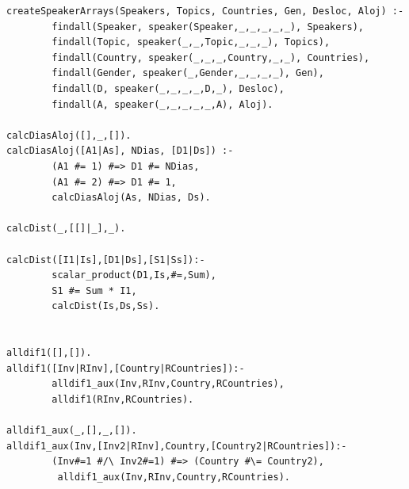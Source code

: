 \documentclass[runningheads,a4paper]{llncs}
\begin{document}
\begin{verbatim}
createSpeakerArrays(Speakers, Topics, Countries, Gen, Desloc, Aloj) :-
        findall(Speaker, speaker(Speaker,_,_,_,_,_), Speakers),
        findall(Topic, speaker(_,_,Topic,_,_,_), Topics),
        findall(Country, speaker(_,_,_,Country,_,_), Countries),
        findall(Gender, speaker(_,Gender,_,_,_,_), Gen),
        findall(D, speaker(_,_,_,_,D,_), Desloc),
        findall(A, speaker(_,_,_,_,_,A), Aloj).

calcDiasAloj([],_,[]).
calcDiasAloj([A1|As], NDias, [D1|Ds]) :-
        (A1 #= 1) #=> D1 #= NDias,
        (A1 #= 2) #=> D1 #= 1,
        calcDiasAloj(As, NDias, Ds).

calcDist(_,[[]|_],_).

calcDist([I1|Is],[D1|Ds],[S1|Ss]):-
        scalar_product(D1,Is,#=,Sum),
        S1 #= Sum * I1,
        calcDist(Is,Ds,Ss).


alldif1([],[]).
alldif1([Inv|RInv],[Country|RCountries]):-
        alldif1_aux(Inv,RInv,Country,RCountries),
        alldif1(RInv,RCountries).

alldif1_aux(_,[],_,[]).
alldif1_aux(Inv,[Inv2|RInv],Country,[Country2|RCountries]):-
        (Inv#=1 #/\ Inv2#=1) #=> (Country #\= Country2),
         alldif1_aux(Inv,RInv,Country,RCountries).
\end{verbatim}
\end{document}
